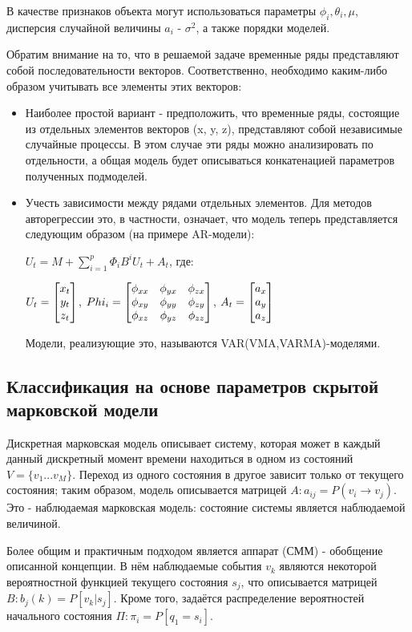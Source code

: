 В качестве признаков объекта могут использоваться параметры $\phi_i, \theta_i, \mu$, дисперсия случайной величины $a_i$ - $\sigma^2$, а также порядки моделей.

Обратим внимание на то, что в решаемой задаче временные ряды представляют собой последовательности векторов. Соответственно, необходимо каким-либо образом учитывать все элементы этих векторов:

\begin{itemize}
\item Наиболее простой вариант - предположить, что временные ряды, состоящие из отдельных элементов векторов (x, y, z), представляют собой независимые случайные процессы. В этом случае эти ряды можно анализировать по отдельности, а общая модель будет описываться конкатенацией параметров полученных подмоделей.
\item Учесть зависимости между рядами отдельных элементов. Для методов авторегрессии это, в частности, означает, что модель теперь представляется следующим образом (на примере AR-модели):

$U_t=M+\sum_{i=1}^p \Phi_iB^i U_t + A_t$,  где:

 $U_t=\begin{bmatrix} x_t \\ y_t \\ z_t \\ \end{bmatrix}$, $Phi_i=\begin{bmatrix} \phi_{xx} & \phi_{yx} & \phi_{zx} \\ \phi_{xy} & \phi_{yy} & \phi_{zy} \\ \phi_{xz} & \phi_{yz} & \phi_{zz} \\ \end{bmatrix}$, 
 $A_t=\begin{bmatrix} a_x \\ a_y \\ a_z \\ \end{bmatrix}$

Модели, реализующие это, называются VAR(VMA,VARMA)-моделями. 
\end{itemize}




\subsection{Классификация на основе параметров скрытой марковской модели}

Дискретная марковская модель описывает систему, которая может в каждый данный дискретный момент времени находиться в одном из состояний $V=\{v_1...v_M\}$. Переход из одного состояния в другое зависит только от текущего состояния; таким образом, модель описывается матрицей $A: a_{ij}=P(v_i \to v_j)$. Это - наблюдаемая марковская модель: состояние системы является наблюдаемой величиной. 

Более общим и практичным подходом является аппарат  (СММ) - обобщение описанной концепции. В нём наблюдаемые события $v_k$ являются некоторой вероятностной функцией текущего состояния $s_j$, что описывается матрицей $B: b_j(k)=P[v_k | s_j]$. Кроме того, задаётся распределение вероятностей начального состояния $\Pi: \pi_i=P[q_1=s_i]$. 

